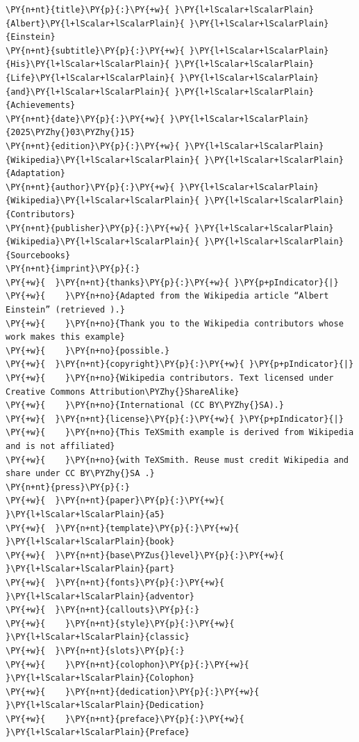 \documentclass[a4paper,twoside]{article}
\begin{document}
\begin{tscode}[lang=yaml, engine=pygments]
\begin{Verbatim}[commandchars=\\\{\},breaklines, breakanywhere, commandchars=\\\{\}]
\PY{n+nt}{title}\PY{p}{:}\PY{+w}{ }\PY{l+lScalar+lScalarPlain}{Albert}\PY{l+lScalar+lScalarPlain}{ }\PY{l+lScalar+lScalarPlain}{Einstein}
\PY{n+nt}{subtitle}\PY{p}{:}\PY{+w}{ }\PY{l+lScalar+lScalarPlain}{His}\PY{l+lScalar+lScalarPlain}{ }\PY{l+lScalar+lScalarPlain}{Life}\PY{l+lScalar+lScalarPlain}{ }\PY{l+lScalar+lScalarPlain}{and}\PY{l+lScalar+lScalarPlain}{ }\PY{l+lScalar+lScalarPlain}{Achievements}
\PY{n+nt}{date}\PY{p}{:}\PY{+w}{ }\PY{l+lScalar+lScalarPlain}{2025\PYZhy{}03\PYZhy{}15}
\PY{n+nt}{edition}\PY{p}{:}\PY{+w}{ }\PY{l+lScalar+lScalarPlain}{Wikipedia}\PY{l+lScalar+lScalarPlain}{ }\PY{l+lScalar+lScalarPlain}{Adaptation}
\PY{n+nt}{author}\PY{p}{:}\PY{+w}{ }\PY{l+lScalar+lScalarPlain}{Wikipedia}\PY{l+lScalar+lScalarPlain}{ }\PY{l+lScalar+lScalarPlain}{Contributors}
\PY{n+nt}{publisher}\PY{p}{:}\PY{+w}{ }\PY{l+lScalar+lScalarPlain}{Wikipedia}\PY{l+lScalar+lScalarPlain}{ }\PY{l+lScalar+lScalarPlain}{Sourcebooks}
\PY{n+nt}{imprint}\PY{p}{:}
\PY{+w}{  }\PY{n+nt}{thanks}\PY{p}{:}\PY{+w}{ }\PY{p+pIndicator}{|}
\PY{+w}{    }\PY{n+no}{Adapted from the Wikipedia article “Albert Einstein” (retrieved ).}
\PY{+w}{    }\PY{n+no}{Thank you to the Wikipedia contributors whose work makes this example}
\PY{+w}{    }\PY{n+no}{possible.}
\PY{+w}{  }\PY{n+nt}{copyright}\PY{p}{:}\PY{+w}{ }\PY{p+pIndicator}{|}
\PY{+w}{    }\PY{n+no}{Wikipedia contributors. Text licensed under Creative Commons Attribution\PYZhy{}ShareAlike}
\PY{+w}{    }\PY{n+no}{International (CC BY\PYZhy{}SA).}
\PY{+w}{  }\PY{n+nt}{license}\PY{p}{:}\PY{+w}{ }\PY{p+pIndicator}{|}
\PY{+w}{    }\PY{n+no}{This TeXSmith example is derived from Wikipedia and is not affiliated}
\PY{+w}{    }\PY{n+no}{with TeXSmith. Reuse must credit Wikipedia and share under CC BY\PYZhy{}SA .}
\PY{n+nt}{press}\PY{p}{:}
\PY{+w}{  }\PY{n+nt}{paper}\PY{p}{:}\PY{+w}{ }\PY{l+lScalar+lScalarPlain}{a5}
\PY{+w}{  }\PY{n+nt}{template}\PY{p}{:}\PY{+w}{ }\PY{l+lScalar+lScalarPlain}{book}
\PY{+w}{  }\PY{n+nt}{base\PYZus{}level}\PY{p}{:}\PY{+w}{ }\PY{l+lScalar+lScalarPlain}{part}
\PY{+w}{  }\PY{n+nt}{fonts}\PY{p}{:}\PY{+w}{ }\PY{l+lScalar+lScalarPlain}{adventor}
\PY{+w}{  }\PY{n+nt}{callouts}\PY{p}{:}
\PY{+w}{    }\PY{n+nt}{style}\PY{p}{:}\PY{+w}{ }\PY{l+lScalar+lScalarPlain}{classic}
\PY{+w}{  }\PY{n+nt}{slots}\PY{p}{:}
\PY{+w}{    }\PY{n+nt}{colophon}\PY{p}{:}\PY{+w}{ }\PY{l+lScalar+lScalarPlain}{Colophon}
\PY{+w}{    }\PY{n+nt}{dedication}\PY{p}{:}\PY{+w}{ }\PY{l+lScalar+lScalarPlain}{Dedication}
\PY{+w}{    }\PY{n+nt}{preface}\PY{p}{:}\PY{+w}{ }\PY{l+lScalar+lScalarPlain}{Preface}
\end{Verbatim}
\end{tscode}
\end{document}

